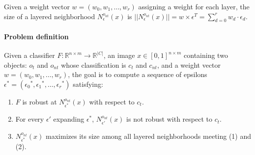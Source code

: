 
Given a weight vector $w = (w_0, w_1, \ldots, w_r)$ assigning a weight for each layer, the size of a layered neighborhood ${N^{o_{nt}}_\epsilon}(x)$ is $||{N^{o_{nt}}_\epsilon}(x)|| = w \times \epsilon^T = \sum_{d=0}^{r}{w_d \cdot \epsilon_d}$.\\

\paragraph{Problem definition} Given a classifier $F: \mathbb{R}^{n \times m} \rightarrow {\mathbb{R}}^{|C|}$, an image $x \in [0,1]^{n \times m}$ containing two objects: $o_t$ and $o_{nt}$ whose classification is $c_t$ and $c_{nt}$, and a weight vector $w = (w_0, w_1, \ldots, w_r)$,
the goal is to compute a sequence of epsilons $\epsilon^* = ({\epsilon_0}^*, {\epsilon_1}^*, \ldots, {\epsilon_r}^*)$ satisfying:

\begin{enumerate}
    \item $F$ is robust at ${N^{o_{nt}}_{\epsilon^*}}(x)$ with respect to $c_t$.
    \item For every $\epsilon'$ expanding $\epsilon^*$, ${N^{o_{nt}}_{\epsilon'}}(x)$ is not robust with respect to $c_t$.
    \item ${N^{o_{nt}}_{\epsilon^*}}(x)$ maximizes its size among all layered neighborhoods meeting (1) and (2).
\end{enumerate}

